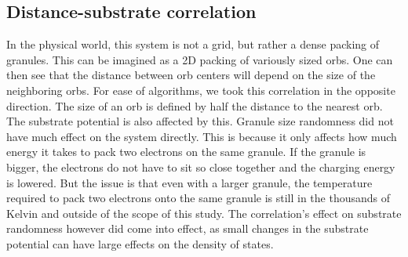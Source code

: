 \subsection{Distance-substrate correlation}
In the physical world, this system is not a grid, but rather a dense packing of granules. This can be imagined as a 2D packing of variously sized orbs. One can then see that the distance between orb centers will depend on the size of the neighboring orbs. For ease of algorithms, we took this correlation in the opposite direction. The size of an orb is defined by half the distance to the nearest orb. The substrate potential is also affected by this. Granule size randomness did not have much effect on the system directly. This is because it only affects how much energy it takes to pack two electrons on the same granule. If the granule is bigger, the electrons do not have to sit so close together and the charging energy is lowered. But the issue is that even with a larger granule, the temperature required to pack two electrons onto the same granule is still in the thousands of Kelvin and outside of the scope of this study. The correlation's effect on substrate randomness however did come into effect, as small changes in the substrate potential can have large effects on the density of states.

